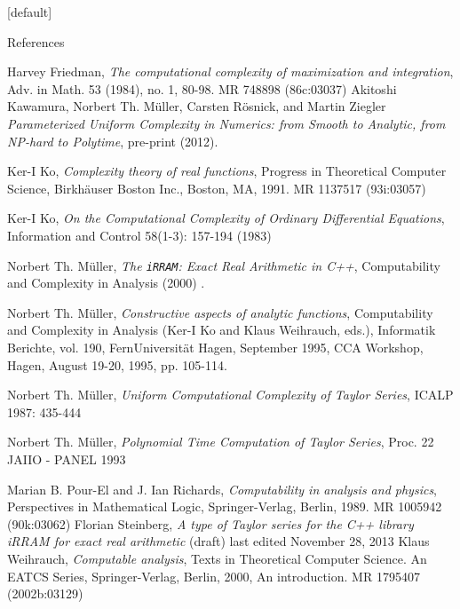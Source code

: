 \documentclass[xcolor=pdftex,dvipsnames,table]{beamer}
\newcommand{\irram}{\texttt{iRRAM}\xspace}
\begin{document}
{
\makeatletter %
    [default] 
    \def\beamer@entrycode{\vspace*{-\headheight}} 
\makeatother
\begin{frame}{References}
\fontsize{6pt}{7.2}\selectfont 
\nocite{*}
\def\newblock{}


\begin{thebibliography}{10}   

  \beamertemplatearticlebibitems
	Harvey Friedman,
    \newblock \emph{ The computational complexity of maximization and integration}, Adv. in Math. 53 (1984), no. 1, 80-98. MR 748898 (86c:03037)
  \beamertemplatearticlebibitems
	Akitoshi Kawamura, Norbert Th. M\"{u}ller, Carsten R\"{o}snick, and
Martin Ziegler
    \newblock \emph{Parameterized Uniform Complexity in Numerics:
from Smooth to Analytic, from NP-hard to Polytime}, pre-print (2012).

  \beamertemplatearticlebibitems
	Ker-I Ko,
    \newblock \emph{ Complexity theory of real functions}, Progress in Theoretical Computer Science, Birkh\"{a}user Boston Inc., Boston, MA, 1991.
MR 1137517 (93i:03057)

  \beamertemplatearticlebibitems
	Ker-I Ko,
    \newblock \emph{  On the Computational Complexity of Ordinary Differential Equations}, Information and Control 58(1-3): 157-194 (1983)


  \beamertemplatearticlebibitems
	Norbert Th. M\"{u}ller,
    \newblock \emph{ The \irram: Exact Real Arithmetic in C++}, Computability and Complexity in Analysis (2000) .

  \beamertemplatearticlebibitems
	Norbert Th. M\"{u}ller,
    \newblock \emph{ Constructive aspects of analytic functions}, Computability
and Complexity in Analysis (Ker-I Ko and Klaus Weihrauch, eds.),
Informatik Berichte, vol. 190, FernUniversit\"{a}t Hagen, September
1995, CCA Workshop, Hagen, August 19-20, 1995, pp. 105-114.

  \beamertemplatearticlebibitems
	Norbert Th. M\"{u}ller,
    \newblock \emph{ Uniform Computational Complexity of Taylor Series}, ICALP 1987: 435-444

  \beamertemplatearticlebibitems
	Norbert Th. M\"{u}ller,
    \newblock \emph{ Polynomial Time Computation of Taylor Series}, Proc. 22 JAIIO - PANEL 1993

  \beamertemplatearticlebibitems
	Marian B. Pour-El and J. Ian Richards,
    \newblock \emph{ Computability in analysis
and physics}, Perspectives in Mathematical Logic, Springer-Verlag,
Berlin, 1989. MR 1005942 (90k:03062)
  \beamertemplatearticlebibitems
	Florian Steinberg,
    \newblock \emph{A type of Taylor series for the C++ library iRRAM for exact real arithmetic} (draft) last edited November 28, 2013
  \beamertemplatearticlebibitems
	Klaus Weihrauch,
    \newblock \emph{Computable analysis}, Texts in Theoretical Computer
Science. An EATCS Series, Springer-Verlag, Berlin, 2000, An
introduction. MR 1795407 (2002b:03129)

  \end{thebibliography}

\end{frame}
}
\end{document}
